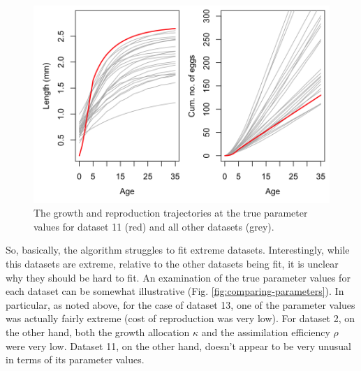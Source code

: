 \documentclass[12pt,reqno,final,pdftex]{amsart}\usepackage[]{graphicx}\usepackage[]{color}
\newenvironment{knitrout}{}{} %
\theoremstyle{plain}
\numberwithin{equation}{part}
\begin{document}
\begin{knitrout}\scriptsize
{}\color{fgcolor}\begin{figure}

\includegraphics[width=\linewidth]{figure/comparing-trajectories-3-1} \hfill{}

\caption[The growth and reproduction trajectories at the true parameter values for dataset 11 (red) and all other datasets (grey)]{The growth and reproduction trajectories at the true parameter values for dataset 11 (red) and all other datasets (grey).}\label{fig:comparing-trajectories-3}
\end{figure}


\end{knitrout}

So, basically, the algorithm struggles to fit extreme datasets.
Interestingly, while this datasets are extreme, relative to the other datasets being fit, it is unclear why they should be hard to fit.
An examination of the true parameter values for each dataset can be somewhat illustrative (Fig. \ref{fig:comparing-parameters}).
In particular, as noted above, for the case of dataset 13, one of the parameter values was actually fairly extreme (cost of reproduction was very low).
For dataset 2, on the other hand, both the growth allocation $\kappa$ and the assimilation efficiency $\rho$ were very low.
Dataset 11, on the other hand, doesn't appear to be very unusual in terms of its parameter values.
\end{document}
